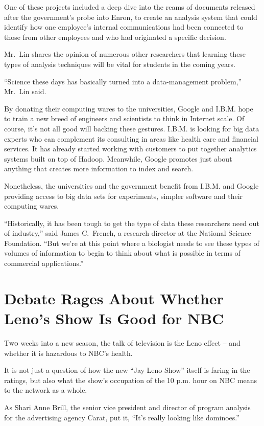﻿\documentclass[12pt]{article}
\begin{document}
One of these projects included a deep dive into the reams of documents released after the
government's probe into Enron, to create an analysis system that could identify how one employee's
internal communications had been connected to those from other employees and who had originated a
specific decision.

Mr.~Lin shares the opinion of numerous other researchers that learning these types of analysis
techniques will be vital for students in the coming years.

``Science these days has basically turned into a data-management problem,'' Mr.~Lin said.

By donating their computing wares to the universities, Google and I.B.M. hope to train a new breed
of engineers and scientists to think in Internet scale. Of course, it's not all good will backing
these gestures. I.B.M. is looking for big data experts who can complement its consulting in areas
like health care and financial services. It has already started working with customers to put
together analytics systems built on top of Hadoop. Meanwhile, Google promotes just about anything
that creates more information to index and search.

Nonetheless, the universities and the government benefit from I.B.M. and Google providing access to
big data sets for experiments, simpler software and their computing wares.

``Historically, it has been tough to get the type of data these researchers need out of industry,''
said James C.~French, a research director at the National Science Foundation. ``But we're at this
point where a biologist needs to see these types of volumes of information to begin to think about
what is possible in terms of commercial applications.''

\section{Debate Rages About Whether Leno's Show Is Good for NBC}

\lettrine{T}{wo} weeks into a new season, the talk of television is the Leno
effect -- and whether it is hazardous to NBC's health.

It is not just a question of how the new ``Jay Leno Show'' itself is faring in the ratings, but also
what the show's occupation of the 10 p.m. hour on NBC means to the network as a whole.

As Shari Anne Brill, the senior vice president and director of program analysis for the advertising
agency Carat, put it, ``It's really looking like dominoes.''
\end{document}
